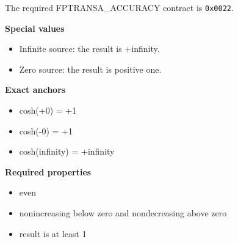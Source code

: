 The required FPTRANSA\_ACCURACY contract is \texttt{0x0022}.

\textbf{Special values}\par
\begin{itemize}
\item Infinite source: the result is +infinity.
\item Zero source: the result is positive one.
\end{itemize}

\textbf{Exact anchors}\par
\begin{itemize}
\item cosh(+0) = +1
\item cosh(-0) = +1
\item cosh(infinity) = +infinity
\end{itemize}

\textbf{Required properties}\par
\begin{itemize}
\item even
\item nonincreasing below zero and nondecreasing above zero
\item result is at least 1
\end{itemize}
